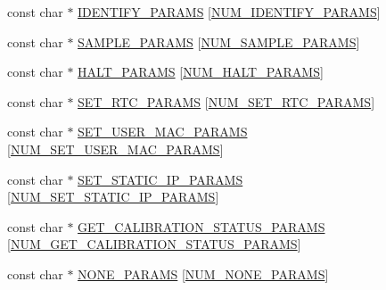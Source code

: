 \begin{DoxyCompactItemize}
\item 
const char $\ast$ \hyperlink{group__command__interpreter_gab114f1bb247754ff4bbc705b92f53222}{I\-D\-E\-N\-T\-I\-F\-Y\-\_\-\-P\-A\-R\-A\-M\-S} \mbox{[}\hyperlink{group__command__interpreter_ga6162173d76eb84687f453450c6973ed5}{N\-U\-M\-\_\-\-I\-D\-E\-N\-T\-I\-F\-Y\-\_\-\-P\-A\-R\-A\-M\-S}\mbox{]}
\item 
const char $\ast$ \hyperlink{group__command__interpreter_ga7008aaf205ddd844e0a5affd12a08775}{S\-A\-M\-P\-L\-E\-\_\-\-P\-A\-R\-A\-M\-S} \mbox{[}\hyperlink{group__command__interpreter_ga1fc6732ec779877a349a53c180c22c29}{N\-U\-M\-\_\-\-S\-A\-M\-P\-L\-E\-\_\-\-P\-A\-R\-A\-M\-S}\mbox{]}
\item 
const char $\ast$ \hyperlink{group__command__interpreter_gafc7b206c3c05fcf1ac21ddd5108f690a}{H\-A\-L\-T\-\_\-\-P\-A\-R\-A\-M\-S} \mbox{[}\hyperlink{group__command__interpreter_ga9998ef3c02f0f85f3f984b04ab30663d}{N\-U\-M\-\_\-\-H\-A\-L\-T\-\_\-\-P\-A\-R\-A\-M\-S}\mbox{]}
\item 
const char $\ast$ \hyperlink{group__command__interpreter_ga37a6030d18afb1719e8b674ac3e649ec}{S\-E\-T\-\_\-\-R\-T\-C\-\_\-\-P\-A\-R\-A\-M\-S} \mbox{[}\hyperlink{group__command__interpreter_ga36e8fbb263e5a9243d52f56202b5e3ce}{N\-U\-M\-\_\-\-S\-E\-T\-\_\-\-R\-T\-C\-\_\-\-P\-A\-R\-A\-M\-S}\mbox{]}
\item 
const char $\ast$ \hyperlink{group__command__interpreter_gac5a3a40f966d23af1d572909c1d8e952}{S\-E\-T\-\_\-\-U\-S\-E\-R\-\_\-\-M\-A\-C\-\_\-\-P\-A\-R\-A\-M\-S} \mbox{[}\hyperlink{group__command__interpreter_gaafcaaef444e34052e8d96c863c90543f}{N\-U\-M\-\_\-\-S\-E\-T\-\_\-\-U\-S\-E\-R\-\_\-\-M\-A\-C\-\_\-\-P\-A\-R\-A\-M\-S}\mbox{]}
\item 
const char $\ast$ \hyperlink{group__command__interpreter_ga27977b5ae6f92883015ee0cb83d54617}{S\-E\-T\-\_\-\-S\-T\-A\-T\-I\-C\-\_\-\-I\-P\-\_\-\-P\-A\-R\-A\-M\-S} \mbox{[}\hyperlink{group__command__interpreter_ga4e0199c558a2061732f2e8a1245cb4a2}{N\-U\-M\-\_\-\-S\-E\-T\-\_\-\-S\-T\-A\-T\-I\-C\-\_\-\-I\-P\-\_\-\-P\-A\-R\-A\-M\-S}\mbox{]}
\item 
const char $\ast$ \hyperlink{group__command__interpreter_gaea50720799ad68731b7672c1974aae1a}{G\-E\-T\-\_\-\-C\-A\-L\-I\-B\-R\-A\-T\-I\-O\-N\-\_\-\-S\-T\-A\-T\-U\-S\-\_\-\-P\-A\-R\-A\-M\-S} \mbox{[}\hyperlink{group__command__interpreter_ga4fc716dc88ef0cbdbc503e78eab47df4}{N\-U\-M\-\_\-\-G\-E\-T\-\_\-\-C\-A\-L\-I\-B\-R\-A\-T\-I\-O\-N\-\_\-\-S\-T\-A\-T\-U\-S\-\_\-\-P\-A\-R\-A\-M\-S}\mbox{]}
\item 
const char $\ast$ \hyperlink{group__command__interpreter_gae6bcf7679336081f08e81ef76a680c81}{N\-O\-N\-E\-\_\-\-P\-A\-R\-A\-M\-S} \mbox{[}\hyperlink{group__command__interpreter_ga6581408fc45ede8a8c643b4700e4113b}{N\-U\-M\-\_\-\-N\-O\-N\-E\-\_\-\-P\-A\-R\-A\-M\-S}\mbox{]}
\end{DoxyCompactItemize}


